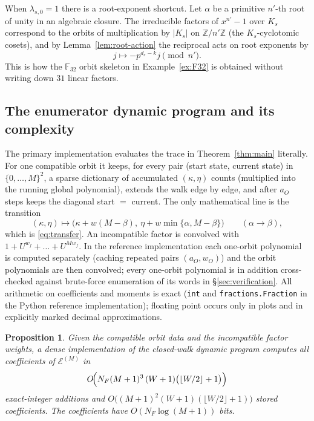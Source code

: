 \documentclass[11pt,a4paper]{article}
\newcommand{\F}{\mathbb F}
\newcommand{\Epoly}{\mathscr E}
\numberwithin{equation}{section}
\theoremstyle{plain}
\newtheorem{proposition}[theorem]{Proposition}
\theoremstyle{definition}
\theoremstyle{remark}
\begin{document}
When $\lambda_{s,0}=1$ there is a root-exponent shortcut.  Let $\alpha$ be a
primitive $n'$-th root of unity in an algebraic closure.  The irreducible
factors of $x^{n'}-1$ over $K_s$ correspond to the orbits of multiplication by
$|K_s|$ on $\mathbb{Z}/n'\mathbb{Z}$ (the $K_s$-cyclotomic cosets), and by
Lemma~\ref{lem:root-action} the reciprocal acts on root exponents by
\begin{equation}\label{eq:root-exponents}
j\longmapsto -p^{d_s-k}j\pmod{n'}.
\end{equation}
This is how the $\F_{32}$ orbit skeleton in Example~\ref{ex:F32} is obtained
without writing down $31$ linear factors.

\subsection{The enumerator dynamic program and its complexity}
\label{sec:dp}

The primary implementation evaluates the trace in
Theorem~\ref{thm:main} literally.  For one compatible orbit it keeps, for
every pair (start state, current state) in $\{0,\ldots,M\}^2$, a sparse
dictionary of accumulated $(\kappa,\eta)$ counts (multiplied into the running
global polynomial), extends the walk edge by edge, and after $a_O$ steps keeps
the diagonal start $=$ current.  The only mathematical line is the transition
\[
(\kappa,\eta)\longmapsto
 \bigl(\kappa+w(M-\beta),\ \eta+w\min\{\alpha,M-\beta\}\bigr)
 \qquad(\alpha\to\beta),
\]
which is \eqref{eq:transfer}.  An incompatible factor is convolved with
$1+U^{w_f}+\dots+U^{Mw_f}$.  In the reference implementation each one-orbit polynomial is
computed separately (caching repeated pairs $(a_O,w_O)$) and the orbit
polynomials are then convolved; every one-orbit polynomial is in addition
cross-checked against brute-force enumeration of its words in
\S\ref{sec:verification}.  All arithmetic on
coefficients and moments is exact (\texttt{int} and
\texttt{fractions.Fraction} in the Python reference implementation); floating
point occurs only in plots and in explicitly marked decimal approximations.

\begin{proposition}\label{prop:complexity}
Given the compatible orbit data and the incompatible factor weights, a dense implementation of the closed-walk dynamic
program computes all coefficients of $\Epoly^{(M)}$ in
\[
O\!\Bigl(N_F(M+1)^3\,(W+1)\bigl(\lfloor W/2\rfloor+1\bigr)\Bigr)
\]
exact-integer additions and
$O\!\bigl((M+1)^2(W+1)(\lfloor W/2\rfloor+1)\bigr)$ stored coefficients.
The coefficients have $O(N_F\log(M+1))$ bits.
\end{proposition}
\end{document}
